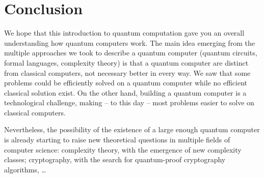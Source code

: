 \documentclass[12pt,a4paper]{article}
\theoremstyle{plain}
\theoremstyle{definition}
\begin{document}
\section*{Conclusion}
We hope that this introduction to quantum computation gave you an overall understanding how quantum computers work. The main idea emerging from the multiple approaches we took to describe a quantum computer (quantum circuits, formal languages, complexity theory) is that a quantum computer are distinct from classical computers, not necessary better in every way. We saw that some problems could be efficiently solved on a quantum computer while no efficient classical solution exist. On the other hand, building a quantum computer is a technological challenge, making -- to this day -- most problems easier to solve on classical computers.

Nevertheless, the possibility of the existence of a large enough quantum computer is already starting to raise new theoretical questions in multiple fields of computer science: complexity theory, with the emergence of new complexity classes; cryptography, with the search for quantum-proof cryptography algorithms, \dots 

\nocite{*}
\printbibliography
\end{document}
